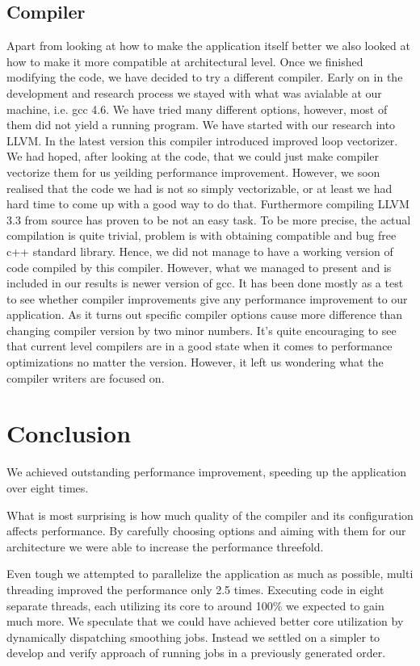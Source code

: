 \documentclass[conference]{IEEEtran}
\begin{document}
\subsection{Compiler}
Apart from looking at how to make the application itself better we also looked at how to make it more compatible at architectural level. Once we finished modifying the code, we have decided to try a different compiler. Early on in the development and research process we stayed with what was avialable at our machine, i.e. gcc 4.6. We have tried many different options, however, most of them did not yield a running program. We have started with our research into LLVM. In the latest version this compiler introduced improved loop vectorizer. We had hoped, after looking at the code, that we could just make compiler vectorize them for us yeilding performance improvement. However, we soon realised that the code we had is not so simply vectorizable, or at least we had hard time to come up with a good way to do that. Furthermore compiling LLVM 3.3 from source has proven to be not an easy task. To be more precise, the actual compilation is quite trivial, problem is with obtaining compatible and bug free c++ standard library. Hence, we did not manage to have a working version of code compiled by this compiler. However, what we managed to present and is included in our results is newer version of gcc. It has been done mostly as a test to see whether compiler improvements give any performance improvement to our application. As it turns out specific compiler options cause more difference than changing compiler version by two minor numbers. It's quite encouraging to see that current level compilers are in a good state when it comes to performance optimizations no matter the version. However, it left us wondering what the compiler writers are focused on.

\section{Conclusion}
We achieved outstanding performance improvement, speeding up the application over eight times.

What is most surprising is how much quality of the compiler and its configuration affects performance. By carefully choosing options and aiming with them for our architecture we were able to increase the performance threefold.

Even tough we attempted to parallelize the application as much as possible, multi threading improved the performance only 2.5 times. Executing code in eight separate threads, each utilizing its core to around 100\% we expected to gain much more. We speculate that we could have achieved better core utilization by dynamically dispatching smoothing jobs. Instead we settled on a simpler to develop and verify approach of running jobs in a previously generated order.
\end{document}
